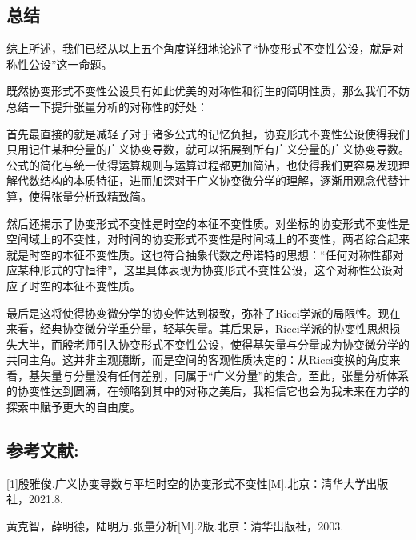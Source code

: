 \documentclass[UTF8]{ctexart}
\begin{document}
\subsection{总结}
综上所述，我们已经从以上五个角度详细地论述了“协变形式不变性公设，就是对称性公设”这一命题。\par
既然协变形式不变性公设具有如此优美的对称性和衍生的简明性质，那么我们不妨总结一下提升张量分析的对称性的好处：\par

首先最直接的就是减轻了对于诸多公式的记忆负担，协变形式不变性公设使得我们只用记住某种分量的广义协变导数，就可以拓展到所有广义分量的广义协变导数。公式的简化与统一使得运算规则与运算过程都更加简洁，也使得我们更容易发现理解代数结构的本质特征，进而加深对于广义协变微分学的理解，逐渐用观念代替计算，使得张量分析致精致简。\par
然后还揭示了协变形式不变性是时空的本征不变性质。对坐标的协变形式不变性是空间域上的不变性，对时间的协变形式不变性是时间域上的不变性，两者综合起来就是时空的本征不变性质。这也符合抽象代数之母诺特的思想：“任何对称性都对应某种形式的守恒律”，这里具体表现为协变形式不变性公设，这个对称性公设对应了时空的本征不变性质。\par
最后是这将使得协变微分学的协变性达到极致，弥补了Ricci学派的局限性。现在来看，经典协变微分学重分量，轻基矢量。其后果是，Ricci学派的协变性思想损失大半，而殷老师引入协变形式不变性公设，使得基矢量与分量成为协变微分学的共同主角。这并非主观臆断，而是空间的客观性质决定的：从Ricci变换的角度来看，基矢量与分量没有任何差别，同属于“广义分量”的集合。至此，张量分析体系的协变性达到圆满，在领略到其中的对称之美后，我相信它也会为我未来在力学的探索中赋予更大的自由度。



\subsection*{参考文献:}
[1]殷雅俊.广义协变导数与平坦时空的协变形式不变性[M].北京：清华大学出版社，2021.8.\par
[2]黄克智，薛明德，陆明万.张量分析[M].2版.北京：清华出版社，2003.\par
\end{document}
